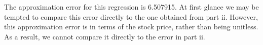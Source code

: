 \documentclass{article}
\begin{document}
The approximation error for this regression is 6.507915. At first glance we may be tempted to compare this error directly to the one obtained from part ii. However, this approximation error is in terms of the stock price, rather than being unitless. As a result, we cannot compare it directly to the error in part ii. 
\end{document}
